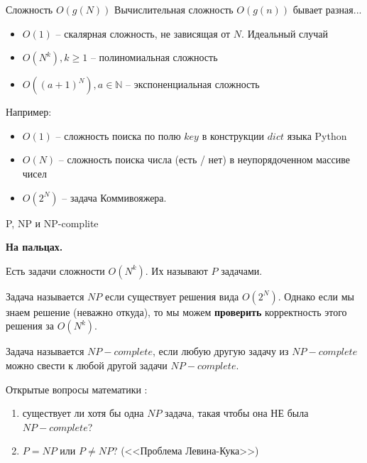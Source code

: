 \begin{frame}{Сложность $O(g(N))$}
	Вычислительная сложность $O(g(n))$ бывает разная...
	
	\begin{itemize}
		\item $O(1)$ -- скалярная сложность, не зависящая от $N$. Идеальный случай
		\item $O(N^k), k \geqslant 1 $ -- полиномиальная сложность
		\item $O((a+1)^N), a \in \mathbb{N}$ -- экспоненциальная сложность
	\end{itemize}
	
	Например:
	\begin{itemize}
		\item $O(1)$ -- сложность поиска по полю $key$ в конструкции $dict$ языка Python
		\item $O(N)$ -- сложность поиска числа (есть / нет) в неупорядоченном массиве чисел
		\item $O(2^N)$ -- задача Коммивояжера.
	\end{itemize}
\end{frame}



\begin{frame}{P, NP и NP-complite}
	\footnotesize
	
	\textbf{На пальцах.}
	
	Есть задачи сложности $O(N^k)$. Их называют $P$ задачами.
	
	Задача называется $NP$ если существует решения вида $O(2^N)$. 
	Однако если мы знаем решение (неважно откуда), то мы можем
	\textbf{проверить} корректность этого решения за $O(N^k)$.
	
	Задача называется $NP-complete$, если любую другую задачу из $NP-complete$
	можно свести к любой другой задачи $NP-complete$.
	
	Открытые вопросы математики :
	\begin{enumerate}
		\item существует ли хотя бы одна $NP$ задача, такая чтобы она НЕ была $NP-complete$?
		\item $P = NP$ или $P \neq NP$? (<<Проблема Левина-Кука>>)
	\end{enumerate}
	
	
	
\end{frame}



